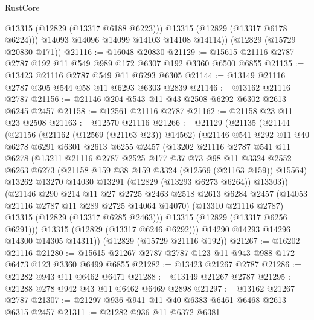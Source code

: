 \begin{lexlean}{RustCore}
\begin{coremodule}
            @13315
            (@12829 (@13317 @6188 @6223)))
          @13315
          (@12829 (@13317 @6178 @6224)))
        @14093
        @14096
        @14099
        @14103
        @14108
        @14114))
    (@12829 (@15729 @20830 @171))
@21116 := @16048 @20830
@21129 := @15615 @21116 @2787 @2787 @192 @11 @549 @989 @172 @6307 @192 @3360 @6500 @6855
@21135 := @13423 @21116 @2787 @549 @11 @6293 @6305
@21144 := @13149 @21116 @2787 @305 @544 @58 @11 @6293 @6303 @2839
@21146 := @13162 @21116 @2787
@21156 := @21146 @204 @543 @11 @43 @2508 @6292 @6302 @2613 @6245 @2457
@21158 := @12561 @21116 @2787
@21162 := @21158 @23 @11 @23 @2508
@21163 := @12570 @21116
@21266 := @21129
    (@21135
      (@21144
        (@21156
          (@21162 (@12569 (@21163 @23)) @14562)
          (@21146
            @541
            @292
            @11
            @40
            @6278
            @6291
            @6301
            @2613
            @6255
            @2457
            (@13202
              @21116
              @2787
              @541
              @11
              @6278
              (@13211
                @21116
                @2787
                @2525
                @177
                @37
                @73
                @98
                @11
                @3324
                @2552
                @6263
                @6273
                (@21158 @159 @38 @159 @3324 (@12569 (@21163 @159)) @15564)
                @13262
                @13270
                @14030
                @13291
                (@12829 (@13293 @6273 @6264))
                @13303))
            (@21146
              @290
              @214
              @11
              @27
              @2725
              @2463
              @2518
              @2613
              @6284
              @2457
              (@14053 @21116 @2787 @11 @289 @2725 @14064 @14070)
              (@13310 @21116 @2787)
              @13315
              (@12829 (@13317 @6285 @2463)))
            @13315
            (@12829 (@13317 @6256 @6291)))
          @13315
          (@12829 (@13317 @6246 @6292)))
        @14290
        @14293
        @14296
        @14300
        @14305
        @14311))
    (@12829 (@15729 @21116 @192))
@21267 := @16202 @21116
@21280 := @15615 @21267 @2787 @2787 @123 @11 @943 @988 @172 @6473 @123 @3360 @6499 @6855
@21282 := @13423 @21267 @2787
@21286 := @21282 @943 @11 @6462 @6471
@21288 := @13149 @21267 @2787
@21295 := @21288 @278 @942 @43 @11 @6462 @6469 @2898
@21297 := @13162 @21267 @2787
@21307 := @21297 @936 @941 @11 @40 @6383 @6461 @6468 @2613 @6315 @2457
@21311 := @21282 @936 @11 @6372 @6381

\end{coremodule}
\end{lexlean}
